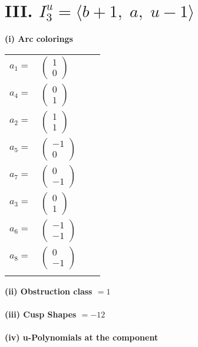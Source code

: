 \documentclass[1p]{elsarticle_modified}
\theoremstyle{definition}
\begin{document}
\centering \section*{III. $I^u_{3}= \langle b+1,\;a,\;u-1 \rangle$}
\flushleft \textbf{(i) Arc colorings}\\
\begin{tabular}{m{7pt} m{180pt} m{7pt} m{180pt} }
\flushright $a_{1}=$&$\begin{pmatrix}1\\0\end{pmatrix}$ \\
\flushright $a_{4}=$&$\begin{pmatrix}0\\1\end{pmatrix}$ \\
\flushright $a_{2}=$&$\begin{pmatrix}1\\1\end{pmatrix}$ \\
\flushright $a_{5}=$&$\begin{pmatrix}-1\\0\end{pmatrix}$ \\
\flushright $a_{7}=$&$\begin{pmatrix}0\\-1\end{pmatrix}$ \\
\flushright $a_{3}=$&$\begin{pmatrix}0\\1\end{pmatrix}$ \\
\flushright $a_{6}=$&$\begin{pmatrix}-1\\-1\end{pmatrix}$ \\
\flushright $a_{8}=$&$\begin{pmatrix}0\\-1\end{pmatrix}$\\&\end{tabular}
\flushleft \textbf{(ii) Obstruction class $= 1$}\\~\\
\flushleft \textbf{(iii) Cusp Shapes $= -12$}\\~\\
\newpage\renewcommand{\arraystretch}{1}
\flushleft \textbf{(iv) u-Polynomials at the component}\newline \\
\end{document}

